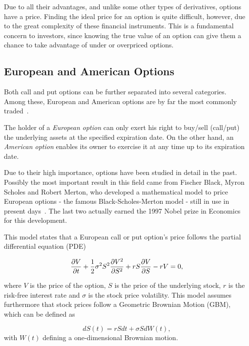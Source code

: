 \documentclass[a4paper,twocolumn,aps,prd,longbibliography,superscriptaddress]{revtex4-1}
\begin{document}
Due to all their advantages, and unlike some other types of derivatives, options have a price. Finding the ideal price for an option is quite difficult, however, due to the great complexity of these financial instruments. This is a fundamental concern to investors, since knowing the true value of an option can give them a chance to take advantage of under or overpriced options.




\subsection{European and American Options}
Both call and put options can be further separated into several categories. Among these, European and American options are by far the most commonly traded~\cite{Hull}.

The holder of a \textit{European option} can only exert his right to buy/sell (call/put) the underlying assets at the specified expiration date.
On the other hand, an \textit{American option} enables its owner to exercise it at any time up to its expiration date.



Due to their high importance, options have been studied in detail in the past.
Possibly the most important result in this field came from Fischer Black, Myron Scholes and Robert Merton, who developed a mathematical model to price European options - the famous Black-Scholes-Merton model - still in use in present days~\cite{Hull}. The last two actually earned the 1997 Nobel prize in Economics for this development.

This model states that a European call or put option's price follows the partial differential equation (PDE)

\begin{equation}
\pdv{V}{t}+\frac{1}{2}\sigma^2S^2\pdv{V^2}{S^2}+rS\pdv{V}{S}-rV=0,
\end{equation}

\noindent where $V$ is the price of the option, $S$ is the price of the underlying stock, $r$ is the risk-free interest rate and $\sigma$ is the stock price volatility.
This model assumes furthermore that stock prices follow a Geometric Brownian Motion (GBM), which can be defined as

\begin{equation}\label{BS}
dS(t)=rSdt+\sigma SdW(t),
\end{equation}
\noindent with $W(t)$ defining a one-dimensional Brownian motion.
\end{document}
